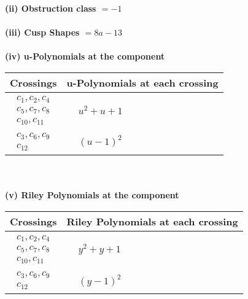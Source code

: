 \documentclass[1p]{elsarticle_modified}
\theoremstyle{definition}
\begin{document}
\flushleft \textbf{(ii) Obstruction class $= -1$}\\~\\
\flushleft \textbf{(iii) Cusp Shapes $= 8 a-13$}\\~\\
\newpage\renewcommand{\arraystretch}{1}
\flushleft \textbf{(iv) u-Polynomials at the component}\newline \\
\begin{tabular}{m{50pt}|m{274pt}}
Crossings & \hspace{64pt}u-Polynomials at each crossing \\
\hline $$\begin{aligned}c_{1},c_{2},c_{4}\\c_{5},c_{7},c_{8}\\c_{10},c_{11}\end{aligned}$$&$\begin{aligned}
&u^2+u+1
\end{aligned}$\\
\hline $$\begin{aligned}c_{3},c_{6},c_{9}\\c_{12}\end{aligned}$$&$\begin{aligned}
&(u-1)^2
\end{aligned}$\\
\hline
\end{tabular}\\~\\
\newpage\renewcommand{\arraystretch}{1}
\flushleft \textbf{(v) Riley Polynomials at the component}\newline \\
\begin{tabular}{m{50pt}|m{274pt}}
Crossings & \hspace{64pt}Riley Polynomials at each crossing \\
\hline $$\begin{aligned}c_{1},c_{2},c_{4}\\c_{5},c_{7},c_{8}\\c_{10},c_{11}\end{aligned}$$&$\begin{aligned}
&y^2+y+1
\end{aligned}$\\
\hline $$\begin{aligned}c_{3},c_{6},c_{9}\\c_{12}\end{aligned}$$&$\begin{aligned}
&(y-1)^2
\end{aligned}$\\
\hline
\end{tabular}\\~\\
\end{document}
